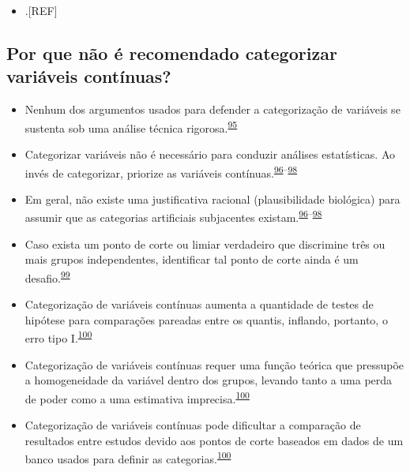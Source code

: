 \documentclass[
  a4paper,
]{book}
\providecommand{\tightlist}{%
  \setlength{\itemsep}{0pt}\setlength{\parskip}{0pt}}
\begin{document}
\begin{itemize}
\tightlist
\item
  .{[}REF{]}
\end{itemize}

\hypertarget{por-que-nuxe3o-uxe9-recomendado-categorizar-variuxe1veis-contuxednuas}{%
\subsection{Por que não é recomendado categorizar variáveis contínuas?}\label{por-que-nuxe3o-uxe9-recomendado-categorizar-variuxe1veis-contuxednuas}}

\begin{itemize}
\item
  Nenhum dos argumentos usados para defender a categorização de variáveis se sustenta sob uma análise técnica rigorosa.\textsuperscript{\protect\hyperlink{ref-MacCallum2002}{95}}
\item
  Categorizar variáveis não é necessário para conduzir análises estatísticas. Ao invés de categorizar, priorize as variáveis contínuas.\textsuperscript{\protect\hyperlink{ref-Altman2006}{96}--\protect\hyperlink{ref-Collins2016}{98}}
\item
  Em geral, não existe uma justificativa racional (plausibilidade biológica) para assumir que as categorias artificiais subjacentes existam.\textsuperscript{\protect\hyperlink{ref-Altman2006}{96}--\protect\hyperlink{ref-Collins2016}{98}}
\item
  Caso exista um ponto de corte ou limiar verdadeiro que discrimine três ou mais grupos independentes, identificar tal ponto de corte ainda é um desafio.\textsuperscript{\protect\hyperlink{ref-Prince2017}{99}}
\item
  Categorização de variáveis contínuas aumenta a quantidade de testes de hipótese para comparações pareadas entre os quantis, inflando, portanto, o erro tipo I.\textsuperscript{\protect\hyperlink{ref-Bennette2012}{100}}
\item
  Categorização de variáveis contínuas requer uma função teórica que pressupõe a homogeneidade da variável dentro dos grupos, levando tanto a uma perda de poder como a uma estimativa imprecisa.\textsuperscript{\protect\hyperlink{ref-Bennette2012}{100}}
\item
  Categorização de variáveis contínuas pode dificultar a comparação de resultados entre estudos devido aos pontos de corte baseados em dados de um banco usados para definir as categorias.\textsuperscript{\protect\hyperlink{ref-Bennette2012}{100}}
\end{itemize}
\end{document}
